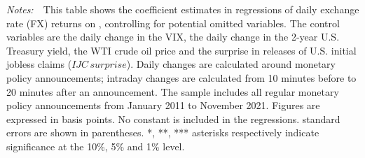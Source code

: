 \documentclass[a4paper,12pt]{article} 		%
\newcommand{\tabnote}[1]{
	\begin{tablenotes}[para,flushleft]
		\footnotesize \emph{Notes:~}~#1
	\end{tablenotes}
}
\newcommand{\textchange}[1]{\iftoggle{revised}{\textcolor{blue}{#1}}{#1}}
\providecommand{\lastobsfx}{November 2021}
\begin{document}
\begin{normalsize}
\begin{table}[b!]
\begin{center}
\begin{threeparttable}
				\tabnote{This table shows the coefficient estimates in regressions of daily exchange rate (FX) returns on \textchange{policy rate surprises (PRS)}, controlling for potential omitted variables. \textchange{The surprises are calculated using both intraday and daily data.} The control variables are the daily change in the VIX, the daily change in the 2-year U.S. Treasury yield, the WTI crude oil price and the surprise in releases of U.S. initial jobless claims (\(IJC \, surprise\)). Daily changes are calculated around monetary policy announcements; intraday changes are calculated from 10 minutes before to 20 minutes after an announcement. The sample includes all regular monetary policy announcements from January 2011 to \lastobsfx. Figures are expressed in basis points. No constant is included in the regressions. \textchange{Heteroskedasticity-robust} standard errors are shown in parentheses. *, **, *** asterisks respectively indicate significance at the 10\%, 5\% and 1\% level.}
			\end{threeparttable}
		\end{center}
	\end{table}
\end{normalsize}
\end{document}
